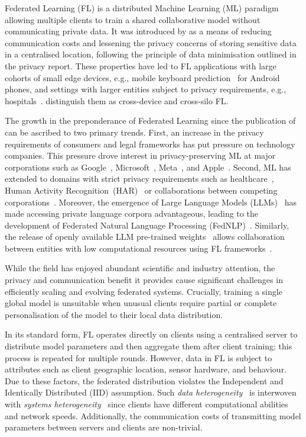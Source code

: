 
Federated Learning (FL) is a distributed Machine Learning (ML) paradigm allowing multiple clients to train a shared collaborative model without communicating private data. It was introduced by \citet{FedAvg} as a means of reducing communication costs and lessening the privacy concerns of storing sensitive data in a centralised location, following the principle of data minimisation outlined in the \citet{White_House_Report} privacy report. These properties have led to FL applications with large cohorts of small edge devices, e.g., mobile keyboard prediction~\citep{GoogleKeyboard} for Android phones, and settings with larger entities subject to privacy requirements, e.g., hospitals~\citep{FLmedicine}. \citet{AdvancedAndOpenProblems} distinguish them as cross-device and cross-silo FL\@.

The growth in the preponderance of Federated Learning since the publication of \citet{FedAvg} can be ascribed to two primary trends. First, an increase in the privacy requirements of consumers and legal frameworks has put pressure on technology companies. This pressure drove interest in privacy-preserving ML at major corporations such as Google~\citep{FedAvg,GoogleKeyboard,tensorflowfederated,PracticalPrivateFLkairouz21b}, Microsoft~\citep{FLINT,Flute}, Meta~\citep{PAPAYA,FedBuff}, and Apple~\citep{AppleFL}. Second, ML has extended to domains with strict privacy requirements such as healthcare~\citep{FLmedicine,FutureOfHealth,BigDataCancer}, Human Activity Recognition~(HAR)~\citep{HARusingFL_2018,ClusterFL} or collaborations between competing corporations~\citep{SustainableIncentive,TowardsFairPrivacyPreservingFL}. Moreover, the emergence of Large Language Models (LLMs)~\citep{OpportunitiesAndRisksLLM} has made accessing private language corpora advantageous, leading to the development of Federated Natural Language Processing (FedNLP)~\citep{FedNLP}. Similarly, the release of openly available LLM pre-trained weights~\citep{LLaMA} allows collaboration between entities with low computational resources using FL frameworks~\citep{Flower,FedScale,FedML}.

While the field has enjoyed abundant scientific and industry attention, the privacy and communication benefit it provides cause significant challenges in efficiently scaling and evolving federated systems. Crucially, training a single global model is unsuitable when unusual clients require partial or complete personalisation of the model to their local data distribution.

In its standard form, FL operates directly on clients using a centralised server to distribute model parameters and then aggregate them after client training; this process is repeated for multiple rounds. However, data in FL is subject to attributes such as client geographic location, sensor hardware, and behaviour. Due to these factors, the federated distribution violates the Independent and Identically Distributed (IID) assumption. Such \emph{data heterogeneity}~\citep[sec. 3.1]{AdvancedAndOpenProblems} is interwoven with \emph{systems heterogeneity}~\citep[sec. 7.2]{AdvancedAndOpenProblems} since clients have different computational abilities and network speeds. Additionally, the communication costs of transmitting model parameters between servers and clients are non-trivial.

